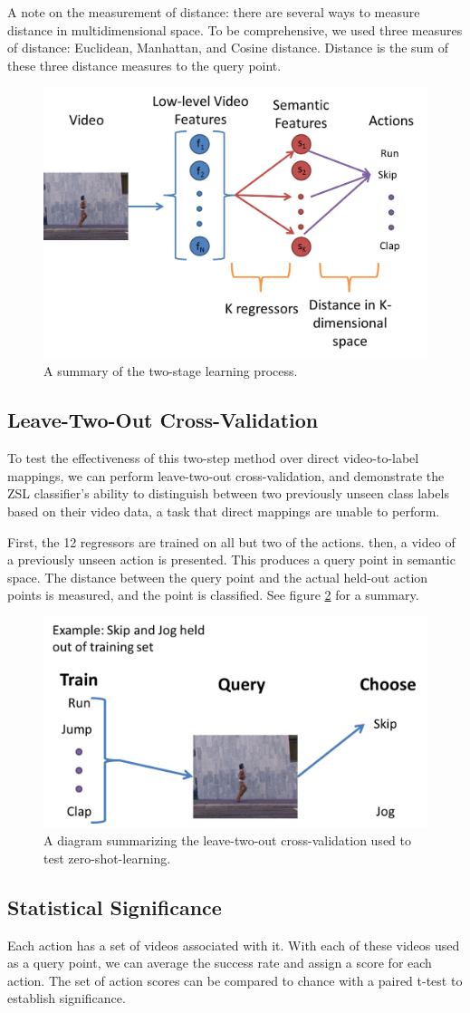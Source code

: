 \documentclass{article}
\begin{document}
A note on the measurement of distance: there are several ways to measure distance in multidimensional space. To be comprehensive, we used three measures of distance: Euclidean, Manhattan, and Cosine distance. Distance is the sum of these three distance measures to the query point.
\begin{figure}[h]
\centering
\includegraphics[width=.4\linewidth]{2stagelearning.png}
\caption{A summary of the two-stage learning process.}
\label{2stage}
\end{figure}
\subsection{Leave-Two-Out Cross-Validation}
To test the effectiveness of this two-step method over direct video-to-label mappings, we can perform leave-two-out cross-validation, and demonstrate the ZSL classifier’s ability to distinguish between two previously unseen class labels based on their video data, a task that direct mappings are unable to perform.

First, the 12 regressors are trained on all but two of the actions.  then, a video of a previously unseen action is presented. This produces a query point in semantic space.  The distance between the query point and the actual held-out action points is measured, and the point is classified. See figure \ref{ltocv} for a summary.

\begin{figure}[h]
\centering
\includegraphics[width = .4\linewidth]{ltocv}
\caption{A diagram summarizing the leave-two-out cross-validation used to test zero-shot-learning.}
\label{ltocv}
\end{figure}
\subsection{Statistical Significance}
Each action has a set of videos associated with it. With each of these videos used as a query point, we can average the success rate and assign a score for each action. The set of action scores can be compared to chance with a paired t-test to establish significance.
\end{document}
